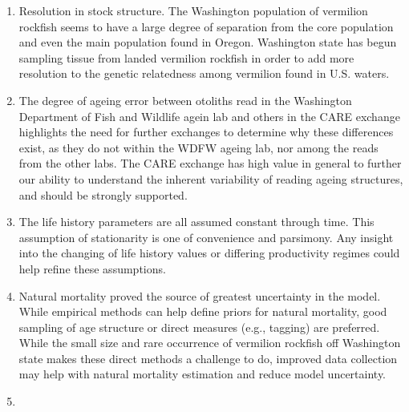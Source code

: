 \documentclass[11pt,
  english,
  a4paper,
]{article}
\begin{document}
\begin{enumerate}
\def\labelenumi{\arabic{enumi}.}
\item

  Resolution in stock structure. The Washington population of vermilion rockfish seems to have a large degree of separation from the core population and even the main population found in Oregon. Washington state has begun sampling tissue from landed vermilion rockfish in order to add more resolution to the genetic relatedness among vermilion found in U.S. waters.

  \tagmcend\tagstructend\tagstructend
\item

  The degree of ageing error between otoliths read in the Washington Department of Fish and Wildlife agein lab and others in the CARE exchange highlights the need for further exchanges to determine why these differences exist, as they do not within the WDFW ageing lab, nor among the reads from the other labs. The CARE exchange has high value in general to further our ability to understand the inherent variability of reading ageing structures, and should be strongly supported.

  \tagmcend\tagstructend\tagstructend
\item

  The life history parameters are all assumed constant through time. This assumption of stationarity is one of convenience and parsimony. Any insight into the changing of life history values or differing productivity regimes could help refine these assumptions.

  \tagmcend\tagstructend\tagstructend
\item

  Natural mortality proved the source of greatest uncertainty in the model. While empirical methods can help define priors for natural mortality, good sampling of age structure or direct measures (e.g., tagging) are preferred. While the small size and rare occurrence of vermilion rockfish off Washington state makes these direct methods a challenge to do, improved data collection may help with natural mortality estimation and reduce model uncertainty.

  \tagmcend\tagstructend\tagstructend
\item


\end{enumerate}
\end{document}
